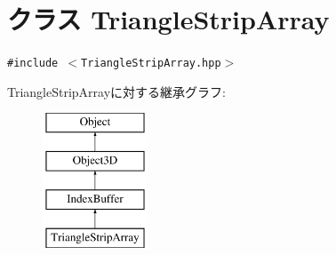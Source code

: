 \hypertarget{classm3g_1_1TriangleStripArray}{
\section{クラス TriangleStripArray}
\label{classm3g_1_1TriangleStripArray}
}
{\tt \#include $<$TriangleStripArray.hpp$>$}

TriangleStripArrayに対する継承グラフ:\begin{figure}[H]
\begin{center}
\leavevmode
\includegraphics[height=4cm]{classm3g_1_1TriangleStripArray}
\end{center}
\end{figure}
